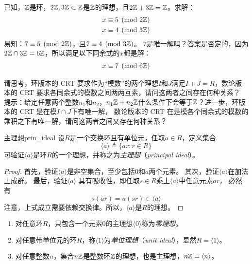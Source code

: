 \begin{example}
已知，${\mathbb Z}$是环，$2{\mathbb Z}, 3{\mathbb Z} \subset {\mathbb Z}$是${\mathbb Z}$的理想，且$2{\mathbb Z} + 3{\mathbb Z} = {\mathbb Z}$。求解：
\begin{align*}
x &\equiv 5 \pmod{2{\mathbb Z}}\\
x &\equiv 4 \pmod{3{\mathbb Z}}
\end{align*}
易知：$ 7 \equiv 5 \pmod{2{\mathbb Z}}$，且$7 \equiv 4 \pmod{3{\mathbb Z}}$。
$7$是唯一解吗？答案是否定的，因为$2{\mathbb Z} \cap 3{\mathbb Z} = 6{\mathbb Z}$，所以满足以下同余式的$x$都是解：
\[ x \equiv 7 \pmod{6 {\mathbb Z}}\]
\end{example}

\begin{thinking}
\label{rem:ideal_crt}
请思考，环版本的 CRT 要求作为“模数”的两个理想$I$和$J$满足$I + J = R$，数论版本的 CRT 要求各同余式的模数之间两两互素，请问这两者之间存在何种关系？
提示：给定任意两个整数$n_1$和$n_2$，$n_1{\mathbb Z}+ n_2{\mathbb Z}$什么条件下会等于${\mathbb Z}$？进一步，环版本的 CRT 是在模$I\cap J$下有唯一解，
数论版本的 CRT 在是模各个同余式的模数的乘积之下有唯一解，请问这两者之间又存在何种关系？
\end{thinking}

\begin{proposition}{主理想}{prin_ideal}
设$R$是一个交换环且有单位元，任取$a \in R$，定义集合
\[ \langle a \rangle \triangleq \{ar: r \in R\}\]
可验证$\langle a \rangle$是环$R$的一个理想，并称之为\emph{主理想}（\emph{principal ideal}）。
\end{proposition}

\begin{proof}
首先，验证$\langle a \rangle $是非空集合，至少包括$0$和$a$两个元素。
其次，验证$\langle a \rangle$在加法上成群。
最后，验证$\langle a \rangle$ 具有吸收性，即任取$s \in R$乘上$\langle a \rangle $中任意元素$ar$，
必然有
\[s (ar) =  a(sr) \in \langle a \rangle \]
注意，上式成立需要依赖交换律。所以，$\langle a \rangle$是$R$的理想。
\end{proof}

\begin{example}
\label{exm:ideal2}
\begin{enumerate}
\item 对任意环$R$，只包含一个元素$0$的主理想$\langle 0 \rangle$称为\emph{零理想}。

\item 对任意带单位元的环$R$，称$\langle 1 \rangle$为\emph{单位理想}（\emph{unit ideal}），显然$R = \langle 1 \rangle$。

\item 对任意整数$n$，集合$n{\mathbb Z}$是整数环${\mathbb Z}$的理想，也是主理想，$n{\mathbb Z} = \langle n \rangle$。
\end{enumerate}
 
\end{example}

